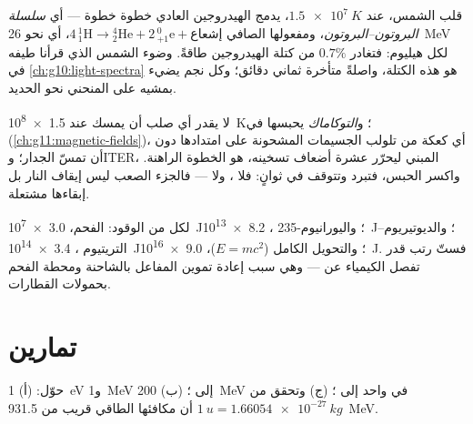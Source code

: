 \begin{example}\label{ex:g12:nuclear-energy:sun}
قلب الشمس، عند $\qty{1.5e7}{K}$، يدمج الهيدروجين العادي خطوة خطوة ---
أي \emph{سلسلة البروتون--البروتون}، ومفعولها الصافي
$4\,{}^{1}_{1}\mathrm{H} \to {}^{4}_{2}\mathrm{He} + 2\,{}^{0}_{+1}\mathrm{e}
+ \text{إشعاع}$، أي نحو \qty{26}{MeV} لكل هيليوم: فتغادر $0.7\%$ من
كتلة الهيدروجين طاقةً. وضوء الشمس الذي قرأنا طيفه في
\cref{ch:g10:light-spectra} هو هذه الكتلة، واصلةً متأخرة ثماني دقائق؛ وكل
نجم يضيء بمشيه على المنحني نحو الحديد.
\end{example}

\begin{remark}\label{rem:g12:nuclear-energy:iter}
لا يقدر أي صلب أن يمسك  عند \qty{1.5e8}{K}؛ و\emph{التوكاماك} يحبسها في
 (\cref{ch:g11:magnetic-fields})، أي كعكة من 
تلولب الجسيمات المشحونة على امتدادها دون أن تمسّ الجدار؛ وITER، المبني
ليحرّر عشرة أضعاف  تسخينه، هو الخطوة الراهنة. واكسر
الحبس، فتبرد  وتتوقف في ثوانٍ: فلا ، ولا
 --- فالجزء الصعب ليس إيقاف النار بل إبقاءها مشتعلة.
\end{remark}

\begin{example}\label{ex:g12:nuclear-energy:ladder}
 لكل  من الوقود: الفحم، \qty{3.0e7}{J}؛ واليورانيوم-235 ،
\qty{8.2e13}{J}؛ والديوتيريوم--التريتيوم ، \qty{3.4e14}{J}؛ والتحويل
الكامل ($E = mc^2$)، \qty{9.0e16}{J}. فستّ رتب قدر تفصل
الكيمياء عن  --- وهي سبب إعادة تموين المفاعل بالشاحنة
ومحطة الفحم بحمولات القطارات.
\end{example}

\section{تمارين}

\begin{exercise}[$\star$]\label{exo:g12:nuclear-energy:1}
حوّل: (أ) \qty{1}{eV} و\qty{1}{MeV} إلى ؛ (ب) \qty{200}{MeV} في
 واحد إلى ؛ (ج) وتحقق من $\qty{1}{u} = \qty{1.66054e-27}{kg}$
أن مكافئها الطاقي قريب من \qty{931.5}{MeV}.
\end{exercise}

